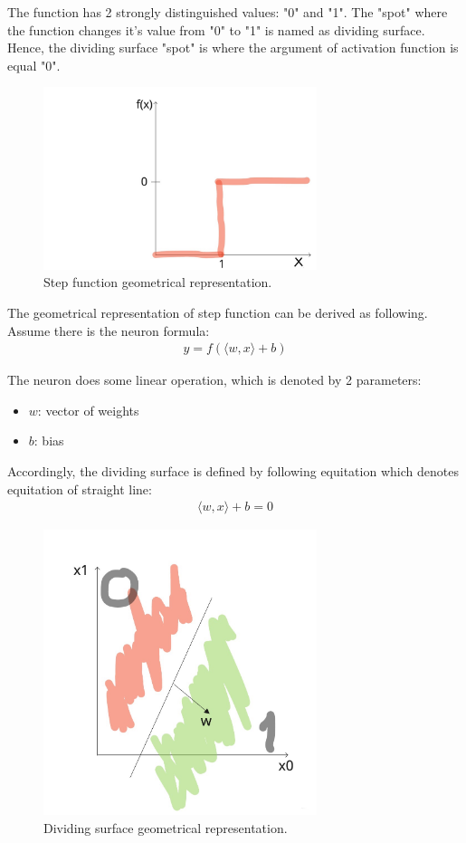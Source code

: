 \documentclass{article}
\begin{document}
The function has 2 strongly distinguished values: "0" and "1". The "spot" where the function changes it's value from "0" to "1" is named as dividing surface. Hence, the dividing surface "spot" is where the argument of activation function is equal "0".

\begin{figure}[h]
    \centering \includegraphics[width=8cm]{images/step_function.jpg}
    \caption {Step function geometrical representation.}
\end{figure}

The geometrical representation of step function can be derived as following. Assume there is the neuron formula:
\begin{align*}
y = f(\langle w, x \rangle + b)
\end{align*}

The neuron does some linear operation, which is denoted by 2 parameters:
\begin{itemize}
    \item $w$: vector of weights
    \item $b$: bias
\end{itemize}
Accordingly, the dividing surface is defined by following equitation which denotes equitation of straight line:
\begin{align*}
\langle w, x \rangle + b = 0
\end{align*}

\begin{figure}[h]
    \centering \includegraphics[width=8cm]{images/dividing_surface.jpg}
    \caption {Dividing surface geometrical representation.}
\end{figure}
\end{document}
